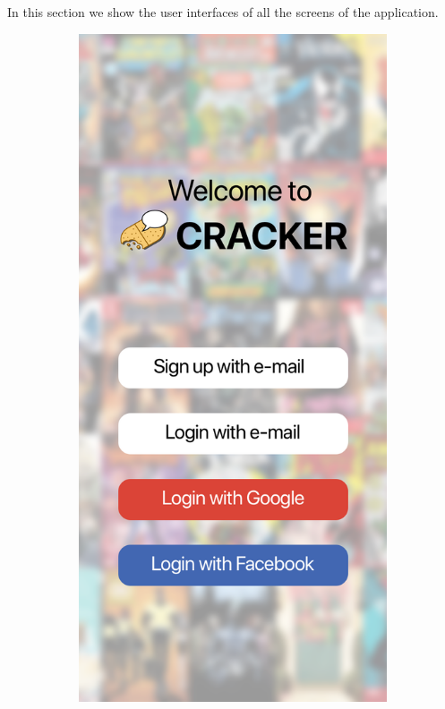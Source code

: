 In this section we show the user interfaces of all the screens of the application. \newline

\vspace{28mm}

\begin{figure}[h]
  \begin{subfigure}[b]{0.4\textwidth}
    \includegraphics[width=\textwidth]{img/mockups/login}

\end{subfigure}
\end{figure}
